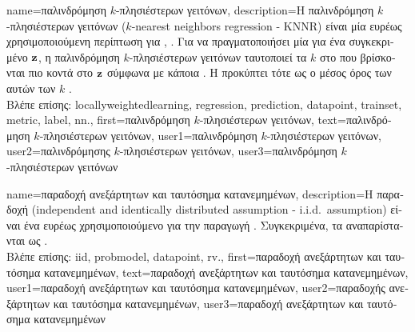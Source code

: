 {name={\foreignlanguage{greek}{παλινδρόμηση $k$-πλησιέστερων γειτόνων}},
	description={\foreignlanguage{greek}{Η παλινδρόμηση $k$-πλησιέστερων 
		γειτόνων} ($k$-nearest neighbors regression - KNNR) 
		\foreignlanguage{greek}{είναι μία ευρέως χρησιμοποιούμενη περίπτωση}  
		\foreignlanguage{greek}{για}  \cite{MLBasics}, \cite{BishopBook}. 
		\foreignlanguage{greek}{Για να πραγματοποιήσει μία}  \foreignlanguage{greek}{για ένα συγκεκριμένο}  
		 ${\bf z}$, \foreignlanguage{greek}{η παλινδρόμηση $k$-πλησιέστερων γειτόνων ταυτοποιεί τα} 
		$k$  \foreignlanguage{greek}{στο}  \foreignlanguage{greek}{που βρίσκονται πιο κοντά 
		στο ${\bf z}$ σύμφωνα με κάποια} . \foreignlanguage{greek}{Η}  
		\foreignlanguage{greek}{προκύπτει τότε ως ο μέσος όρος των} 
		 \foreignlanguage{greek}{αυτών των} $k$ . 
				\\
		\foreignlanguage{greek}{Βλέπε επίσης:} \gls{locallyweightedlearning}, \gls{regression}, \gls{prediction}, \gls{datapoint}, \gls{trainset}, 
		\gls{metric}, \gls{label}, \gls{nn}.}, 
	first={\foreignlanguage{greek}{παλινδρόμηση $k$-πλησιέστερων γειτόνων}},
	text={\foreignlanguage{greek}{παλινδρόμηση $k$-πλησιέστερων γειτόνων}},
	user1={\foreignlanguage{greek}{παλινδρόμηση $k$-πλησιέστερων γειτόνων}}, %
	user2={\foreignlanguage{greek}{παλινδρόμησης $k$-πλησιέστερων γειτόνων}}, %
	user3={\foreignlanguage{greek}{παλινδρόμηση $k$-πλησιέστερων γειτόνων}} %
}

{name={\foreignlanguage{greek}{παραδοχή ανεξάρτητων και ταυτόσημα κατανεμημένων}}, 
	description={\foreignlanguage{greek}{Η παραδοχή} 
		(independent and identically distributed assumption - i.i.d.\ assumption) \foreignlanguage{greek}{είναι ένα 
		ευρέως χρησιμοποιούμενο}  \foreignlanguage{greek}{για την παραγωγή}
		. \foreignlanguage{greek}{Συγκεκριμένα, τα}  
		\foreignlanguage{greek}{αναπαρίστανται ως}  .
		\\ 
		\foreignlanguage{greek}{Βλέπε επίσης:} \gls{iid}, \gls{probmodel}, \gls{datapoint}, \gls{rv}.},
	first={\foreignlanguage{greek}{παραδοχή ανεξάρτητων και ταυτόσημα κατανεμημένων}},
	text={\foreignlanguage{greek}{παραδοχή ανεξάρτητων και ταυτόσημα κατανεμημένων}},
	user1={\foreignlanguage{greek}{παραδοχή ανεξάρτητων και ταυτόσημα κατανεμημένων}}, %
  	user2={\foreignlanguage{greek}{παραδοχής ανεξάρτητων και ταυτόσημα κατανεμημένων}}, %
	user3={\foreignlanguage{greek}{παραδοχή ανεξάρτητων και ταυτόσημα κατανεμημένων}} %
}%

